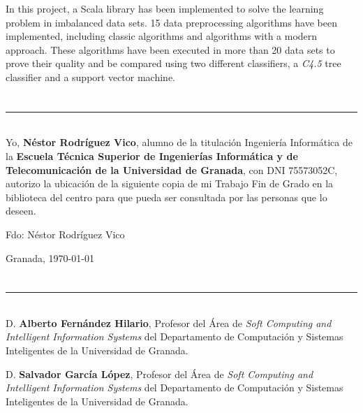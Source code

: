 In this project, a Scala library has been implemented to solve the learning problem in imbalanced data sets. 15 data preprocessing algorithms have been implemented, including classic algorithms and algorithms with a modern approach. These algorithms have been executed in more than 20 data sets to prove their quality and be compared using two different classifiers, a \textit{C4.5} tree classifier and a support vector machine.

\chapter*{}
\thispagestyle{empty}

\noindent\rule[-1ex]{\textwidth}{2pt}\\[4.5ex]

Yo, \textbf{Néstor Rodríguez Vico}, alumno de la titulación Ingeniería Informática de la \textbf{Escuela Técnica Superior de Ingenierías Informática y de Telecomunicación de la Universidad de Granada}, con DNI 75573052C, autorizo la ubicación de la siguiente copia de mi Trabajo Fin de Grado en la biblioteca del centro para que pueda ser consultada por las personas que lo deseen.

\vspace{6cm}

\noindent Fdo: Néstor Rodríguez Vico

\vspace{2cm}

\begin{flushright}
Granada, \today
\end{flushright}


\chapter*{}
\thispagestyle{empty}

\noindent\rule[-1ex]{\textwidth}{2pt}\\[4.5ex]

D. \textbf{Alberto Fernández Hilario}, Profesor del Área de \textit{Soft Computing and Intelligent Information Systems} del Departamento de Computación y Sistemas Inteligentes de la Universidad de Granada.

\vspace{0.5cm}

D. \textbf{Salvador García López}, Profesor del Área de \textit{Soft Computing and Intelligent Information Systems} del Departamento de Computación y Sistemas Inteligentes de la Universidad de Granada.


